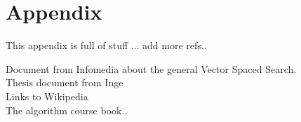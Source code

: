 \chapter{Appendix}

This appendix is full of stuff ... add more refs..

Document from Infomedia about the general Vector Spaced Search.\\
Thesis document from Inge\\
Links to Wikipedia\\
The algorithm course book..